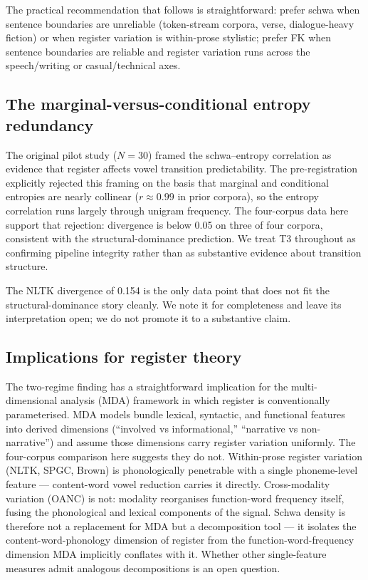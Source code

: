 \documentclass[11pt,a4paper]{article}
\begin{document}
The practical recommendation that follows is straightforward: prefer
schwa when sentence boundaries are unreliable (token-stream corpora,
verse, dialogue-heavy fiction) or when register variation is
within-prose stylistic; prefer FK when sentence boundaries are
reliable and register variation runs across the speech/writing or
casual/technical axes.

\subsection{The marginal-versus-conditional entropy redundancy}

The original pilot study (\(N{=}30\)) framed the schwa--entropy
correlation as evidence that register affects vowel transition
predictability. The pre-registration explicitly rejected this framing
on the basis that marginal and conditional entropies are nearly
collinear (\(r \approx 0.99\) in prior corpora), so the entropy
correlation runs largely through unigram frequency. The four-corpus
data here support that rejection: divergence is below 0.05 on three
of four corpora, consistent with the structural-dominance prediction.
We treat T3 throughout as confirming pipeline integrity rather than
as substantive evidence about transition structure.

The NLTK divergence of 0.154 is the only data point that does not fit
the structural-dominance story cleanly. We note it for completeness
and leave its interpretation open; we do not promote it to a
substantive claim.

\subsection{Implications for register theory}

The two-regime finding has a straightforward implication for the
multi-dimensional analysis (MDA) framework in which register is
conventionally parameterised. MDA models bundle lexical, syntactic,
and functional features into derived dimensions (``involved vs
informational,'' ``narrative vs non-narrative'') and assume those
dimensions carry register variation uniformly. The four-corpus
comparison here suggests they do not. Within-prose register variation
(NLTK, SPGC, Brown) is phonologically penetrable with a single
phoneme-level feature --- content-word vowel reduction carries it
directly. Cross-modality variation (OANC) is not: modality
reorganises function-word frequency itself, fusing the phonological
and lexical components of the signal. Schwa density is therefore not
a replacement for MDA but a decomposition tool --- it isolates the
content-word-phonology dimension of register from the
function-word-frequency dimension MDA implicitly conflates with it.
Whether other single-feature measures admit analogous decompositions
is an open question.
\end{document}
